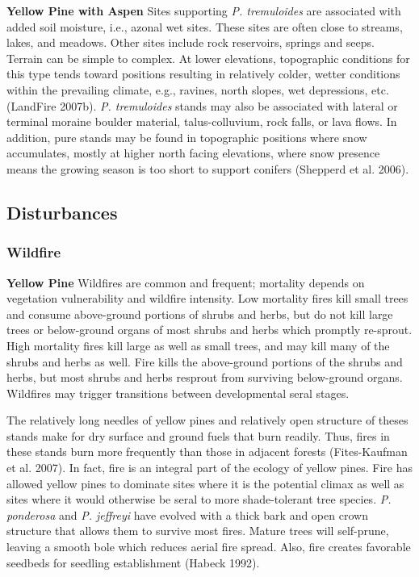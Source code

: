 \textbf{Yellow Pine with Aspen}	Sites supporting \emph{P. tremuloides} are associated with added soil moisture, i.e., azonal wet sites. These sites are often close to streams, lakes, and meadows. Other sites include rock reservoirs, springs and seeps. Terrain can be simple to complex. At lower elevations, topographic conditions for this type tends toward positions resulting in relatively colder, wetter conditions within the prevailing climate, e.g., ravines, north slopes, wet depressions, etc. (LandFire 2007b). \emph{P. tremuloides} stands may also be associated with lateral or terminal moraine boulder material, talus-colluvium, rock falls, or lava flows. In addition, pure stands may be found in topographic positions where snow accumulates, mostly at higher north facing elevations, where snow presence means the growing season is too short to support conifers (Shepperd et al. 2006). 


\subsection*{Disturbances}

\subsubsection{Wildfire}
\textbf{Yellow Pine} Wildfires are common and frequent; mortality depends on vegetation vulnerability and wildfire intensity. Low mortality fires kill small trees and consume above-ground portions of shrubs and herbs, but do not kill large trees or below-ground organs of most shrubs and herbs which promptly re-sprout. High mortality fires kill large as well as small trees, and may kill many of the shrubs and herbs as well. Fire kills the above-ground portions of the shrubs and herbs, but most shrubs and herbs resprout from surviving below-ground organs. Wildfires may trigger transitions between developmental seral stages.

The relatively long needles of yellow pines and relatively open structure of theses stands make for dry surface and ground fuels that burn readily. Thus, fires in these stands burn more frequently than those in adjacent forests (Fites-Kaufman et al. 2007). In fact, fire is an integral part of the ecology of yellow pines. Fire has allowed yellow pines to dominate sites where it is the potential climax as well as sites where it would otherwise be seral to more shade-tolerant tree species. \emph{P. ponderosa} and \emph{P. jeffreyi} have evolved with a thick bark and open crown structure that allows them to survive most fires. Mature trees will self-prune, leaving a smooth bole which reduces aerial fire spread. Also, fire creates favorable seedbeds for seedling establishment (Habeck 1992). 

